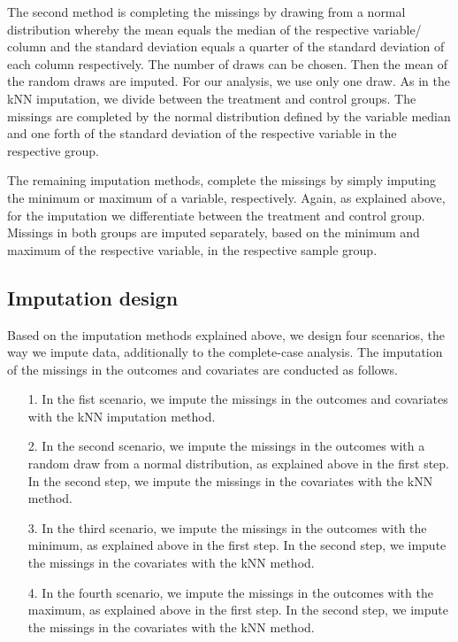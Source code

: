 The second method is completing the missings by drawing from a normal distribution whereby the mean equals the median of the respective variable/ column and the standard deviation equals a quarter of the standard deviation of each column respectively. The number of draws can be chosen. Then the mean of the random draws are imputed. For our analysis, we use only one draw. As in the \ac{kNN} imputation, we divide between the treatment and control groups. The missings are completed by the normal distribution defined by the variable median and one forth of the standard deviation of the respective variable in the respective group.

The remaining imputation methods, complete the missings by simply imputing the minimum or maximum of a variable, respectively. Again, as explained above, for the imputation we differentiate between the treatment and control group. Missings in both groups are imputed separately, based on the minimum and maximum of the respective variable, in the respective sample group.

\subsection{Imputation design}
Based on the imputation methods explained above, we design four scenarios, the way we impute data, additionally to the complete-case analysis. The imputation of the missings in the outcomes and covariates are conducted as follows.

\begin{itemize}
	\item[1.] In the fist scenario, we impute the missings in the outcomes and covariates with the \ac{kNN} imputation method.
	\item[2.] In the second scenario, we impute the missings in the outcomes with a random draw from a normal distribution, as explained above in the first step. In the second step, we impute the missings in the covariates with the \ac{kNN} method.
	\item[3.] In the third scenario, we impute the missings in the outcomes with the minimum, as explained above in the first step. In the second step, we impute the missings in the covariates with the \ac{kNN} method.
	\item[4.] In the fourth scenario, we impute the missings in the outcomes with the maximum, as explained above in the first step. In the second step, we impute the missings in the covariates with the \ac{kNN} method.
\end{itemize}

